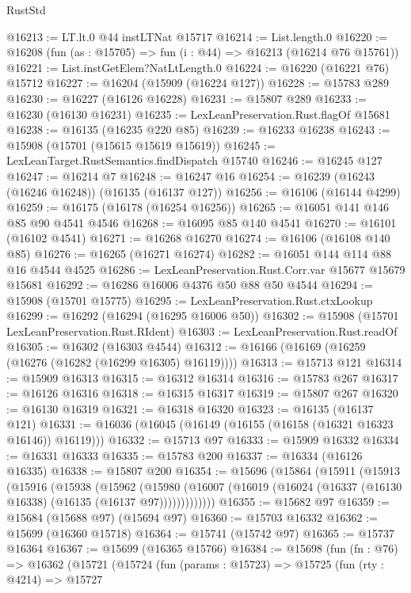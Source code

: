 \begin{lexlean}{RustStd}
\begin{coremodule}
@16213 := LT.lt.{0} @44 instLTNat @15717
@16214 := List.length.{0}
@16220 := @16208 (fun (as : @15705) => fun (i : @44) => @16213 (@16214 @76 @15761))
@16221 := List.instGetElem?NatLtLength.{0}
@16224 := @16220 (@16221 @76) @15712
@16227 := @16204 (@15909 (@16224 @127))
@16228 := @15783 @289
@16230 := @16227 (@16126 @16228)
@16231 := @15807 @289
@16233 := @16230 (@16130 @16231)
@16235 := LexLeanPreservation.Rust.flagOf @15681
@16238 := @16135 (@16235 @220 @85)
@16239 := @16233 @16238
@16243 := @15908 (@15701 (@15615 @15619 @15619))
@16245 := LexLeanTarget.RustSemantics.findDispatch @15740
@16246 := @16245 @127
@16247 := @16214 @7
@16248 := @16247 @16
@16254 := @16239 (@16243 (@16246 @16248)) (@16135 (@16137 @127))
@16256 := @16106 (@16144 @4299)
@16259 := @16175 (@16178 (@16254 @16256))
@16265 := @16051 @141 @146 @85 @90 @4541 @4546
@16268 := @16095 @85 @140 @4541
@16270 := @16101 (@16102 @4541)
@16271 := @16268 @16270
@16274 := @16106 (@16108 @140 @85)
@16276 := @16265 (@16271 @16274)
@16282 := @16051 @144 @114 @88 @16 @4544 @4525
@16286 := LexLeanPreservation.Rust.Corr.var @15677 @15679 @15681
@16292 := @16286 @16006 @4376 @50 @88 @50 @4544
@16294 := @15908 (@15701 @15775)
@16295 := LexLeanPreservation.Rust.ctxLookup
@16299 := @16292 (@16294 (@16295 @16006 @50))
@16302 := @15908 (@15701 LexLeanPreservation.Rust.RIdent)
@16303 := LexLeanPreservation.Rust.readOf
@16305 := @16302 (@16303 @4544)
@16312 := @16166 (@16169 (@16259 (@16276 (@16282 (@16299 @16305) @16119))))
@16313 := @15713 @121
@16314 := @15909 @16313
@16315 := @16312 @16314
@16316 := @15783 @267
@16317 := @16126 @16316
@16318 := @16315 @16317
@16319 := @15807 @267
@16320 := @16130 @16319
@16321 := @16318 @16320
@16323 := @16135 (@16137 @121)
@16331 := @16036 (@16045 (@16149 (@16155 (@16158 (@16321 @16323 @16146)) @16119)))
@16332 := @15713 @97
@16333 := @15909 @16332
@16334 := @16331 @16333
@16335 := @15783 @200
@16337 := @16334 (@16126 @16335)
@16338 := @15807 @200
@16354 := @15696
    (@15864
      (@15911
        (@15913
          (@15916
            (@15938
              (@15962
                (@15980
                  (@16007 (@16019 (@16024 (@16337 (@16130 @16338) (@16135 (@16137 @97)))))))))))))
@16355 := @15682 @97
@16359 := @15684 (@15688 @97) (@15694 @97)
@16360 := @15703 @16332
@16362 := @15699 (@16360 @15718)
@16364 := @15741 (@15742 @97)
@16365 := @15737 @16364
@16367 := @15699 (@16365 @15766)
@16384 := @15698
    (fun (fn : @76) =>
    @16362
      (@15721
        (@15724
          (fun (params : @15723) =>
          @15725
            (fun (rty : @4214) =>
            @15727

\end{coremodule}
\end{lexlean}
